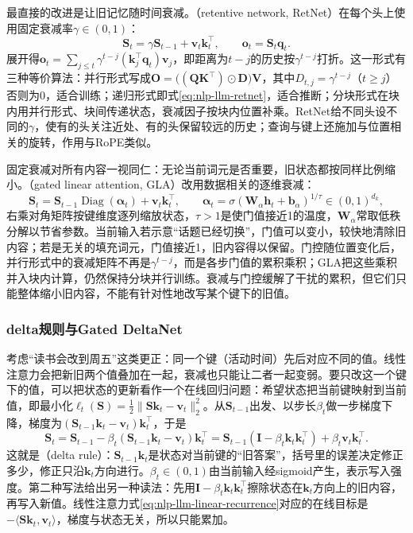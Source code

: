 最直接的改进是让旧记忆随时间衰减。（retentive network, RetNet）在每个头上使用固定衰减率$\gamma\in(0,1)$：
\begin{equation}
 \bm S_t=\gamma\bm S_{t-1}+\bm v_t\bm k_t^{\top},\qquad \bm o_t=\bm S_t\bm q_t .
 \label{eq:nlp-llm-retnet}
\end{equation}
展开得$\bm o_t=\sum_{j\le t}\gamma^{t-j}(\bm k_j^{\top}\bm q_t)\bm v_j$，即距离为$t-j$的历史按$\gamma^{t-j}$打折。这一形式有三种等价算法：并行形式写成$\bm O=\bigl((\bm Q\bm K^{\top})\odot\bm D\bigr)\bm V$，其中$D_{t,j}=\gamma^{t-j}$（$t\ge j$）否则为0，适合训练；递归形式即式\eqref{eq:nlp-llm-retnet}，适合推断；分块形式在块内用并行形式、块间传递状态，衰减因子按块内位置补乘。RetNet给不同头设不同的$\gamma$，使有的头关注近处、有的头保留较远的历史；查询与键上还施加与位置相关的旋转，作用与RoPE类似。

固定衰减对所有内容一视同仁：无论当前词元是否重要，旧状态都按同样比例缩小。（gated linear attention, GLA）改用数据相关的逐维衰减：
\begin{equation}
 \bm S_t=\bm S_{t-1}\operatorname{Diag}(\bm\alpha_t)+\bm v_t\bm k_t^{\top},\qquad
 \bm\alpha_t=\sigma(\bm W_{\alpha}\bm h_t+\bm b_{\alpha})^{1/\tau}\in(0,1)^{d_k},
 \label{eq:nlp-llm-gla}
\end{equation}
右乘对角矩阵按键维度逐列缩放状态，$\tau>1$是使门值接近1的温度，$\bm W_{\alpha}$常取低秩分解以节省参数。当前输入若示意“话题已经切换”，门值可以变小，较快地清除旧内容；若是无关的填充词元，门值接近1，旧内容得以保留。门控随位置变化后，并行形式中的衰减矩阵不再是$\gamma^{t-j}$，而是各步门值的累积乘积；GLA把这些乘积并入块内计算，仍然保持分块并行训练。衰减与门控缓解了干扰的累积，但它们只能整体缩小旧内容，不能有针对性地改写某个键下的旧值。

\subsubsection{delta规则与Gated DeltaNet}
\label{sec:nlp-llm-delta-rule}

考虑“读书会改到周五”这类更正：同一个键（活动时间）先后对应不同的值。线性注意力会把新旧两个值叠加在一起，衰减也只能让二者一起变弱。要只改这一个键下的值，可以把状态的更新看作一个在线回归问题：希望状态把当前键映射到当前值，即最小化$\ell_t(\bm S)=\frac12\lVert\bm S\bm k_t-\bm v_t\rVert_2^2$。从$\bm S_{t-1}$出发、以步长$\beta_t$做一步梯度下降，梯度为$(\bm S_{t-1}\bm k_t-\bm v_t)\bm k_t^{\top}$，于是
\begin{equation}
 \bm S_t=\bm S_{t-1}-\beta_t(\bm S_{t-1}\bm k_t-\bm v_t)\bm k_t^{\top}
 =\bm S_{t-1}(\bm I-\beta_t\bm k_t\bm k_t^{\top})+\beta_t\bm v_t\bm k_t^{\top}.
 \label{eq:nlp-llm-delta}
\end{equation}
这就是（delta rule）：$\bm S_{t-1}\bm k_t$是状态对当前键的“旧答案”，括号里的误差决定修正多少，修正只沿$\bm k_t$方向进行。$\beta_t\in(0,1)$由当前输入经sigmoid产生，表示写入强度。第二种写法给出另一种读法：先用$\bm I-\beta_t\bm k_t\bm k_t^{\top}$擦除状态在$\bm k_t$方向上的旧内容，再写入新值。线性注意力式\eqref{eq:nlp-llm-linear-recurrence}对应的在线目标是$-\langle\bm S\bm k_t,\bm v_t\rangle$，梯度与状态无关，所以只能累加。

